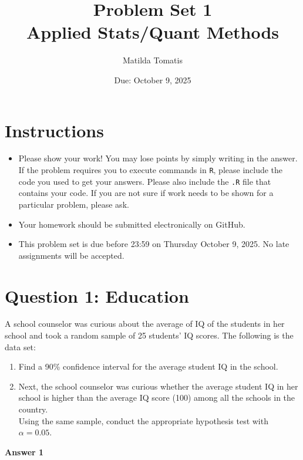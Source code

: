\documentclass[12pt,letterpaper]{article}
\title{Problem Set 1 \\
\large Applied Stats/Quant Methods }
\date{Due: October 9, 2025}
\author{Matilda Tomatis}
\begin{document}
	\maketitle
	
	\section*{Instructions}
	\begin{itemize}
	\item Please show your work! You may lose points by simply writing in the answer. If the problem requires you to execute commands in \texttt{R}, please include the code you used to get your answers. Please also include the \texttt{.R} file that contains your code. If you are not sure if work needs to be shown for a particular problem, please ask.
\item Your homework should be submitted electronically on GitHub.
\item This problem set is due before 23:59 on Thursday October 9, 2025. No late assignments will be accepted.
	\end{itemize}
	
	\vspace{1cm}
	\section*{Question 1: Education}

A school counselor was curious about the average of IQ of the students in her school and took a random sample of 25 students' IQ scores. The following is the data set:\\
\vspace{.5cm}

  

\vspace{1cm}

\begin{enumerate}
	\item Find a 90\% confidence interval for the average student IQ in the school.\\
	
	\item Next, the school counselor was curious  whether  the average student IQ in her school is higher than the average IQ score (100) among all the schools in the country.\\ 
	
	\noindent Using the same sample, conduct the appropriate hypothesis test with $\alpha=0.05$.
\end{enumerate}
\vspace{1cm}
\noindent\textbf{Answer 1}\\
\end{document}
